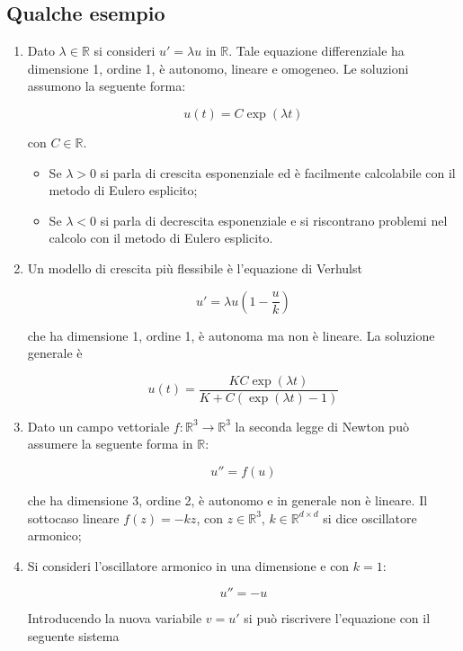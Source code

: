 \documentclass[hidelinks, 10pt]{report}
\begin{document}
\subsection{Qualche esempio}
\noindent
\begin{enumerate}
\item Dato $ \lambda \in \mathbb{R} $ si consideri $ u' = \lambda u $ in $ \mathbb{R} $. Tale equazione differenziale ha dimensione 1, ordine 1, \`e autonomo, lineare e omogeneo. Le soluzioni assumono la seguente forma:

\[ u(t) = C \exp(\lambda t) \]

con $ C \in \mathbb{R} $.

\begin{itemize}
\item Se $ \lambda > 0 $ si parla di crescita esponenziale ed \`e facilmente calcolabile con il metodo di Eulero esplicito;
\item Se $ \lambda < 0 $ si parla di decrescita esponenziale e si riscontrano problemi nel calcolo con il metodo di Eulero esplicito.
\end{itemize}

\item Un modello di crescita pi\`u flessibile \`e l'equazione di Verhulst

\[ u' = \lambda u \left( 1 - \frac{u}{k} \right) \]

che ha dimensione 1, ordine 1, \`e autonoma ma non \`e lineare. La soluzione generale \`e 

\[ u(t) = \frac{K C \exp (\lambda t)}{K + C (\exp (\lambda t) - 1)} \]

\item Dato un campo vettoriale $ f: \mathbb{R}^{3} \to \mathbb{R}^{3} $ la seconda legge di Newton pu\`o assumere la seguente forma in $ \mathbb{R} $:

\[ u'' = f(u) \]

che ha dimensione 3, ordine 2, \`e autonomo e in generale non \`e lineare. Il sottocaso lineare $ f(z) = - kz $, con $ z \in \mathbb{R}^{3} $, $ k \in \mathbb{R}^{d \times d} $ si dice oscillatore armonico;

\item Si consideri l'oscillatore armonico in una dimensione e con $ k  = 1 $:

\[ u'' = - u \]

Introducendo la nuova variabile $ v = u' $ si pu\`o riscrivere l'equazione con il seguente sistema


\end{enumerate}
\end{document}
